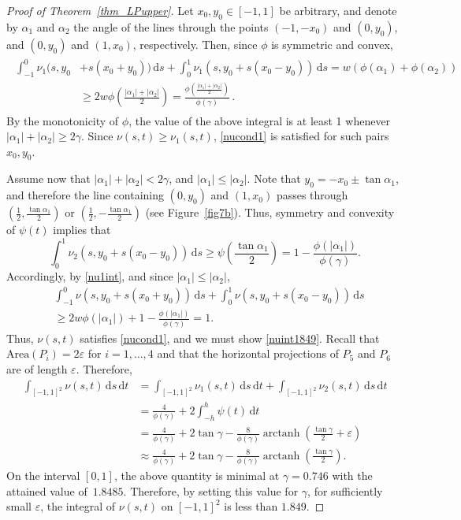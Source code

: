 \documentclass[11pt,a4paper]{amsart}
\newcommand{\eps}{\varepsilon}
\newcommand{\dd}{\,\mathrm{d}}
\DeclareMathOperator\arctanh{arctanh}
\begin{document}
\begin{proof}[Proof of Theorem~\ref{thm_LPupper}]
Let  $x_0, y_0 \in [-1, 1]$ be arbitrary, and denote by $\alpha_1$ and $\alpha_2$ the angle of the lines through the points $(-1, -x_0)$ and $(0, y_0)$, and $(0,y_0)$ and $(1, x_0)$, respectively. Then, since $\phi$ is symmetric and convex,
\begin{align}\label{nu1int}
\begin{split}
\int_{-1}^0\nu_1 (s, y_0 &+ s(x_0 + y_0) ) \dd s + \int_{0}^1 \nu_1 (s, y_0 + s(x_0 - y_0) ) \dd s = w ( \phi(\alpha_1) + \phi(\alpha_2)) \\
&\geq 2 w \phi \left( \frac{|\alpha_1| + |\alpha_2|}{2} \right)= \frac{\phi \left( \frac{|\alpha_1| + |\alpha_2|}{2} \right)}{\phi(\gamma)}\, .
\end{split}
\end{align}
By the monotonicity of $\phi$, the value of the above integral is at least 1 whenever $|\alpha_1 |+ |\alpha_2| \geq 2 \gamma$. Since $\nu(s,t) \geq \nu_1(s,t)$, \eqref{nucond1} is satisfied for such pairs $x_0, y_0$.


Assume now that $|\alpha_1| + |\alpha_2|<2 \gamma$, and $|\alpha_1| \leq |\alpha_2|$. Note that $y_0 = -x_0 \pm \tan \alpha_1$, and therefore
the line containing $(0,y_0)$ and $(1, x_0)$ passes through $(\frac 1 2, \frac{\tan \alpha_1} {2})$ or $(\frac 1 2, -\frac{\tan \alpha_1} {2})$ (see Figure~\ref{fig7b}). Thus, symmetry and convexity of $\psi(t)$ implies that
\[
\int_{0}^1 \nu_2 (s, y_0 + s(x_0 - y_0) ) \dd s \geq  \psi\left(\frac{\tan \alpha_1} {2}\right) = 1 - \frac{\phi(|\alpha_1|)}{\phi(\gamma)}.
\]
Accordingly, by \eqref{nu1int}, and since $|\alpha_1| \leq |\alpha_2|$,
\begin{align*}
&\int_{-1}^0\nu (s, y_0 + s(x_0 + y_0) ) \dd s + \int_{0}^1 \nu (s, y_0 + s(x_0 - y_0) ) \dd s\\
&\geq 2w\phi ( |\alpha_1|)+ 1 - \frac{\phi(|\alpha_1|)}{\phi(\gamma)} = 1.
\end{align*}
Thus, $\nu(s,t)$ satisfies \eqref{nucond1}, and we must show \eqref{nuint1849}. Recall that  $ \textrm{Area}(P_i) = 2 \eps$ for $i = 1, \dots, 4$ and that the horizontal projections of $P_5$ and $P_6$ are of length $\eps$. Therefore,
\begin{align*}
 \int_{[-1,1]^2} \nu(s,t) \dd s \dd t &=  \int_{[-1,1]^2} \nu_1(s,t) \dd s \dd t + \int_{[-1,1]^2} \nu_2(s,t) \dd s \dd t \\
 &= \frac{4}{\phi(\gamma)}  + 2 \int_{-h}^h \psi(t) \dd t\\
 &= \frac{4}{\phi(\gamma)}  + 2 \tan \gamma - \frac 8 {\phi(\gamma)} \arctanh \left( \frac{\tan \gamma}{2}+ \eps \right) \\
 &\approx  \frac{4}{\phi(\gamma)}  + 2 \tan \gamma - \frac 8 {\phi(\gamma)} \arctanh \left( \frac{\tan \gamma}{2}\right).
\end{align*}
On the interval $[0,1]$, the above quantity is minimal at $\gamma= 0.746$ with the attained value of~$1.8485$. Therefore, by setting this value for $\gamma$, for sufficiently small $\eps$, the integral of $\nu(s,t)$ on $[-1,1]^2$ is less than $1.849$.
\end{proof}
\end{document}
